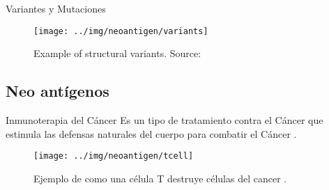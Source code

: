 \documentclass[10pt]{beamer}
\newcommand{\1}{
	\setbeamertemplate{background}{
		\texttt{[image: ../img/1]}
		\tikz[overlay] \fill[fill opacity=0.75,fill=white] (0,0) rectangle (-\paperwidth,\paperheight);
	}
}
\begin{document}
	\begin{frame}{Variantes y Mutaciones}{}
		\begin{figure}[h]
			\centering
			\texttt{[image: ../img/neoantigen/variants]}
			\caption{Example of structural variants. Source: \cite{sv_pacbio_2021}}
			\label{fig:variants}
		\end{figure}	
	\end{frame}

	
	\subsection{Neo antígenos}
	
	\begin{frame}{Inmunoterapia del Cáncer}{}		
		Es un tipo de tratamiento contra el Cáncer que estimula las defensas naturales del cuerpo para combatir el Cáncer \cite{inmunoterapy2022}.
		
		\begin{figure}
			\texttt{[image: ../img/neoantigen/tcell]}
			\caption{Ejemplo de como una célula T destruye células del cancer \cite{nortshore2022}.}
		\end{figure}		
	\end{frame}
	
\end{document}
